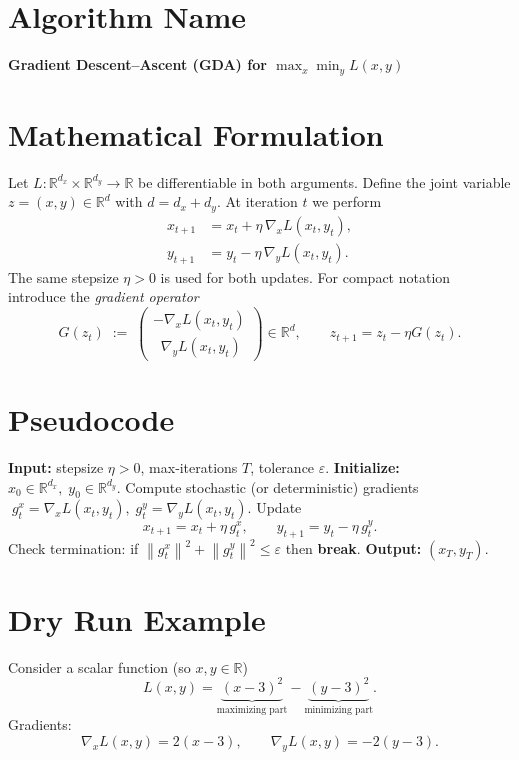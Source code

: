 \documentclass{article}
\newcommand{\norm}[1]{\left\| #1 \right\|}
\begin{document}
\section*{Algorithm Name}
\textbf{Gradient Descent–Ascent (GDA) for \(\displaystyle \max_{x}\min_{y} L(x,y)\)}

\section*{Mathematical Formulation}
Let \(L:\mathbb{R}^{d_x}\times\mathbb{R}^{d_y}\rightarrow\mathbb{R}\) be differentiable in both arguments.
Define the joint variable \(z=(x,y)\in\mathbb{R}^{d}\) with \(d=d_x+d_y\).
At iteration \(t\) we perform
\[
\boxed{
\begin{aligned}
x_{t+1} &= x_{t} + \eta\,\nabla_{x}L(x_t ,y_t) , \\[4pt]
y_{t+1} &= y_{t} - \eta\,\nabla_{y}L(x_t ,y_t) .
\end{aligned}}
\tag{1}
\]
The same stepsize \(\eta>0\) is used for both updates.  
For compact notation introduce the \emph{gradient operator}
\[
G(z_t)\;:=\;\begin{pmatrix}
-\nabla_{x}L(x_t ,y_t)\\[2pt]
\;\;\nabla_{y}L(x_t ,y_t)
\end{pmatrix}
\in\mathbb{R}^{d},
\qquad 
z_{t+1}=z_t-\eta G(z_t).\tag{2}
\]

\section*{Pseudocode}
\begin{algorithm}[H]
\caption{Gradient Descent–Ascent (GDA)}
\begin{algorithmic}[1]
\STATE \textbf{Input:} stepsize \(\eta>0\), max‑iterations \(T\), tolerance \(\varepsilon\).
\STATE \textbf{Initialize:} \(x_0\in\mathbb{R}^{d_x},\;y_0\in\mathbb{R}^{d_y}\).
    \STATE Compute stochastic (or deterministic) gradients 
    \(\;g^x_t=\nabla_{x}L(x_t,y_t),\;
      g^y_t=\nabla_{y}L(x_t,y_t).\)
    \STATE Update 
    \[
    x_{t+1}=x_t+\eta\,g^x_t,\qquad
    y_{t+1}=y_t-\eta\,g^y_t .
    \]
    \STATE Check termination: if 
    \(\norm{g^x_t}^2+\norm{g^y_t}^2\le\varepsilon\) then \textbf{break}.
\ENDFOR
\STATE \textbf{Output:} \((x_T,y_T)\).
\end{algorithmic}
\end{algorithm}

\section*{Dry Run Example}
Consider a scalar function (so \(x,y\in\mathbb{R}\))  
\[
L(x,y)=\underbrace{(x-3)^2}_{\text{maximizing part}}-\underbrace{(y-3)^2}_{\text{minimizing part}} .
\]
Gradients:
\[
\nabla_x L(x,y)=2(x-3),\qquad 
\nabla_y L(x,y)=-2(y-3).
\]
\end{document}
